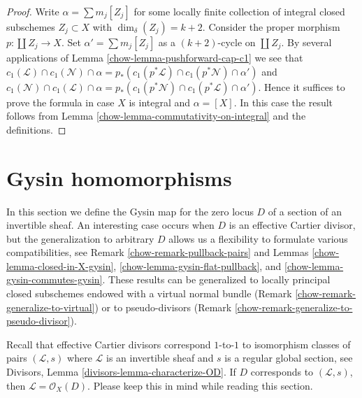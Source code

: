 \begin{proof}

Write $\alpha = \sum m_j[Z_j]$ for some locally finite
collection of integral closed subschemes $Z_j \subset X$
with $\dim_\delta(Z_j) = k + 2$.
Consider the proper morphism $p : \coprod Z_j \to X$.
Set $\alpha' = \sum m_j[Z_j]$ as a $(k + 2)$-cycle on
$\coprod Z_j$. By several applications of
Lemma \ref{chow-lemma-pushforward-cap-c1} we see that
$c_1(\mathcal{L}) \cap c_1(\mathcal{N}) \cap \alpha
= p_*(c_1(p^*\mathcal{L}) \cap c_1(p^*\mathcal{N}) \cap \alpha')$
and
$c_1(\mathcal{N}) \cap c_1(\mathcal{L}) \cap \alpha
= p_*(c_1(p^*\mathcal{N}) \cap c_1(p^*\mathcal{L}) \cap \alpha')$.
Hence it suffices to prove the formula in case $X$ is integral
and $\alpha = [X]$. In this case the result follows
from Lemma \ref{chow-lemma-commutativity-on-integral} and the definitions.
\end{proof}

\section{Gysin homomorphisms}
\label{chow-section-intersecting-effective-Cartier}
In this section we define the Gysin map for the zero locus $D$ of a
section of an invertible sheaf. An interesting case occurs when $D$
is an effective Cartier divisor, but the generalization to arbitrary $D$
allows us a flexibility to formulate various compatibilities, see
Remark \ref{chow-remark-pullback-pairs} and
Lemmas \ref{chow-lemma-closed-in-X-gysin}, \ref{chow-lemma-gysin-flat-pullback}, and
\ref{chow-lemma-gysin-commutes-gysin}.
These results can be generalized to locally principal closed subschemes
endowed with a virtual normal bundle
(Remark \ref{chow-remark-generalize-to-virtual}) or to
pseudo-divisors (Remark \ref{chow-remark-generalize-to-pseudo-divisor}).

\medskip\noindent
Recall that effective Cartier divisors correspond $1$-to-$1$ to
isomorphism classes of pairs $(\mathcal{L}, s)$ where $\mathcal{L}$
is an invertible sheaf and $s$ is a regular global section, see
Divisors, Lemma \ref{divisors-lemma-characterize-OD}.
If $D$ corresponds to $(\mathcal{L}, s)$, then
$\mathcal{L} = \mathcal{O}_X(D)$. Please keep this in mind while
reading this section.

